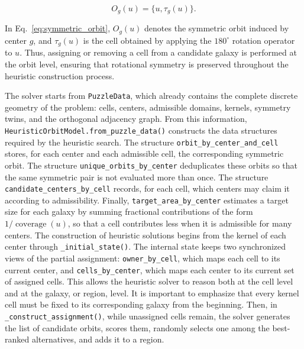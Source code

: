 \begin{equation}
O_g(u) = \{u, \tau_g(u)\}.
\label{eq:symmetric_orbit}
\end{equation}

In Eq.~\ref{eq:symmetric_orbit}, \(O_g(u)\) denotes the symmetric orbit induced by center \(g\), and \(\tau_g(u)\) is the cell obtained by applying the \(180^\circ\) rotation operator to \(u\). Thus, assigning or removing a cell from a candidate galaxy is performed at the orbit level, ensuring that rotational symmetry is preserved throughout the heuristic construction process.

The solver starts from \texttt{PuzzleData}, which already contains the complete discrete geometry of the problem: cells, centers, admissible domains, kernels, symmetry twins, and the orthogonal adjacency graph. From this information, \texttt{HeuristicOrbitModel.from\_puzzle\_data()} constructs the data structures required by the heuristic search. The structure \texttt{orbit\_by\_center\_and\_cell} stores, for each center and each admissible cell, the corresponding symmetric orbit. The structure \texttt{unique\_orbits\_by\_center} deduplicates these orbits so that the same symmetric pair is not evaluated more than once. The structure \texttt{candidate\_centers\_by\_cell} records, for each cell, which centers may claim it according to admissibility. Finally, \texttt{target\_area\_by\_center} estimates a target size for each galaxy by summing fractional contributions of the form \(1/\operatorname{coverage}(u)\), so that a cell contributes less when it is admissible for many centers. The construction of heuristic solutions begins from the kernel of each center through \texttt{\_initial\_state()}. The internal state keeps two synchronized views of the partial assignment: \texttt{owner\_by\_cell}, which maps each cell to its current center, and \texttt{cells\_by\_center}, which maps each center to its current set of assigned cells. This allows the heuristic solver to reason both at the cell level and at the galaxy, or region, level. It is important to emphasize that every kernel cell must be fixed to its corresponding galaxy from the beginning. Then, in \texttt{\_construct\_assignment()}, while unassigned cells remain, the solver generates the list of candidate orbits, scores them, randomly selects one among the best-ranked alternatives, and adds it to a region.


